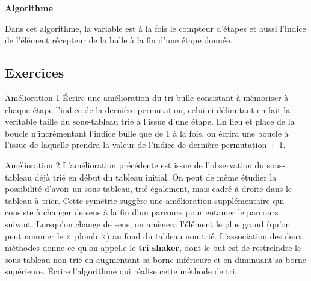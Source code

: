 	{\sffamily\bfseries\upshape
	Algorithme}

	Dans cet algorithme, la variable  est à
	la fois le compteur d’étapes et aussi l’indice de l’élément récepteur
	de la bulle à la fin d’une étape donnée.

	\bigskip
	

	\bigskip

	\subsection*{Exercices}

	\begin{Exercice}{Amélioration 1}
			Écrire une amélioration du tri bulle consistant à mémoriser à chaque
			étape l’indice de la dernière permutation, celui-ci délimitant en fait
			la véritable taille du sous-tableau trié à l’issue d’une étape. En lieu
			et place de la boucle  n’incrémentant l’indice
			bulle que de 1 à la fois, on écrira une boucle  à l’issue de laquelle  prendra la
			valeur de l’indice de dernière permutation + 1.
	\end{Exercice}
	
	\begin{Exercice}{Amélioration 2}
			L’amélioration précédente est issue de l’observation du sous-tableau
			déjà trié en début du tableau initial. On peut de même étudier la
			possibilité d’avoir un sous-tableau, trié également, mais cadré à
			droite dans le tableau à trier. Cette symétrie suggère une amélioration
			supplémentaire qui consiste à changer de sens à la fin d’un parcours
			pour entamer le parcours suivant. Lorsqu’on change de sens, on amènera
			l’élément le plus grand (qu’on peut nommer le «~plomb~») au fond du
			tableau non trié. L’association des deux méthodes donne ce qu’on
			appelle le \textbf{tri shaker}, dont le but est de restreindre le
			sous-tableau non trié en augmentant sa borne inférieure et en diminuant
			sa borne supérieure. Écrire l’algorithme qui réalise cette méthode de
			tri.
	\end{Exercice}
	
